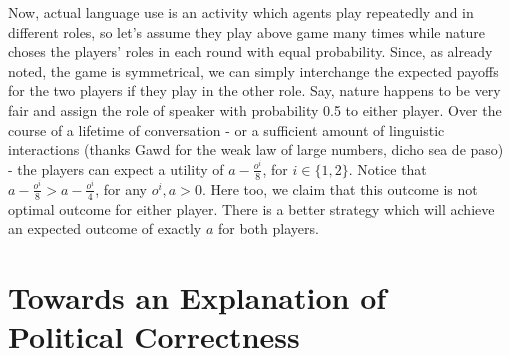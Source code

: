 \documentclass{article}
\begin{document}
Now, actual language use is an activity which agents play repeatedly and in different roles, so let's assume they play above game many times while nature choses the players' roles in each round with equal probability. Since, as already noted, the game is symmetrical, we can simply interchange the expected payoffs for the two players if they play in the other role. Say, nature happens to be very fair and assign the role of speaker with probability 0.5 to either player. Over the course of a lifetime of conversation - or a sufficient amount of linguistic interactions (thanks Gawd for the weak law of large numbers, dicho sea de paso) - the players can expect a utility of $a-\tfrac{o^i}{8}$, for $i\in \{1,2\}$. Notice that $a-\tfrac{o^i}{8} > a-\tfrac{o^i}{4}$, for any $o^i,a>0$. %
Here too, we claim that this outcome is not optimal outcome for either player. There is a better strategy which will achieve an expected outcome of exactly $a$ for both players. 

\begin{comment}
Starting from Spence's seminal "Job Market Signalling", much has been written about games where by sending a message an agent causes a cost. This is the core of so-called \textit{costly signalling games}. Particularly economic theory has been interested in this twist of the Lewisian signaling model.\\
Common assumptions here are that the message's meaning is determined before the start of the game and that sender's cost vector is common knowledge, which, in turn, allows the receiver to distinguish credible and non-credible signals.\\


\begin{table}[h]
\centering
\begin{tabular}{lllll}
States & Cost Sender & Messages & {Cost Receiver} & {Actions} \\ 
$t_1$  & c           & $m_1$    & 0                                  & $a_1$                        \\
$t_2$  & c           & $m_2$    & 0                                  & $a_2$                       
\end{tabular}
\end{table} 
\end{comment}

\section{Towards an Explanation of Political Correctness}
\end{document}
